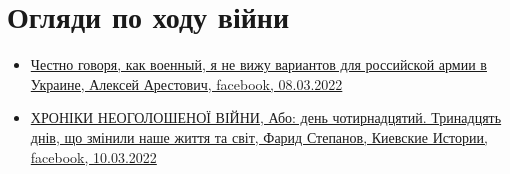  
 
 
 
 
\section{Огляди по ходу війни}

\begin{itemize} %
\item \hyperlink{08_03_2022.fb.arestovich_alexei.1.varianty}{%
Честно говоря, как военный, я не вижу вариантов для российской армии в Украине, Алексей Арестович, %
facebook, 08.03.2022%
}

\item \hyperlink{10_03_2022.fb.fb_group.story_kiev_ua.1.hroniki}{%
ХРОНІКИ НЕОГОЛОШЕНОЇ ВІЙНИ, Або: день чотирнадцятий. Тринадцять днів, що змінили наше життя та світ, %
Фарид Степанов, Киевские Истории, facebook, 10.03.2022%
}

\end{itemize} %
